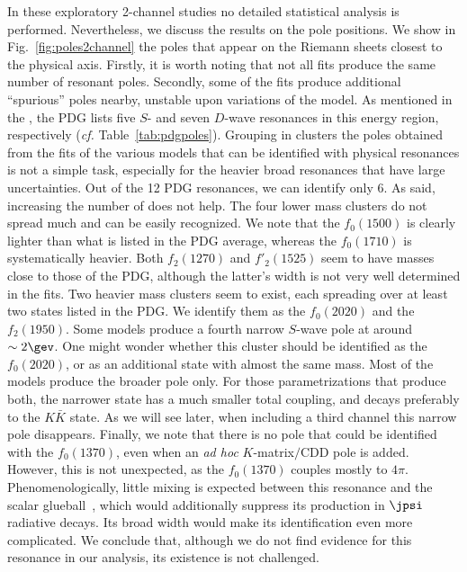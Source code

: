 In these exploratory 2-channel studies no detailed statistical analysis is  performed. Nevertheless, we discuss the results on the pole positions. 
We show in Fig.~\ref{fig:poles2channel} the poles that appear on the Riemann sheets closest to the physical axis. Firstly, it is worth noting that not all fits produce the same number of resonant poles. Secondly, some of the fits produce additional ``spurious'' poles nearby, unstable upon variations of the model.  As mentioned in the , the PDG lists five   $S$- and seven  $D$-wave resonances in this energy region, respectively ({\it cf.} Table~\ref{tab:pdgpoles}).
Grouping in clusters the poles obtained from the fits of the various models  that can be identified with physical resonances is not a simple task, especially for the heavier broad resonances that have large  uncertainties. 
Out of the 12 PDG resonances, we can identify only 6. As said, increasing the number of \KCDD does not help. 
The four lower mass clusters do not spread much and can be easily recognized. We note that the $f_0(1500)$ is clearly lighter than what is listed in the PDG average, whereas the $f_0(1710)$ is systematically heavier. Both $f_2(1270)$ and $f'_2(1525)$ seem to have masses close to those of the PDG, although the latter's width is not very well determined in  the fits.
Two heavier mass clusters seem to exist, each spreading over at least two states listed in the PDG. We identify them as the $f_0(2020)$ and the $f_2(1950)$. Some models produce a fourth narrow $S$-wave pole at around $\sim 2\gev$. One might wonder whether this cluster should be identified as the $f_0(2020)$, or as an additional state with almost the same mass. Most of the models produce the broader pole only. For those parametrizations that produce both, the narrower state has a much smaller total coupling, and decays preferably to the $K \bar K$ state. As we will see later, when including a third  channel this narrow pole disappears. 
Finally, we note that there is no pole that could be identified with the $f_0(1370)$, even when an {\em ad hoc} $K$-matrix$\big/$CDD pole is added. However, this is not unexpected, as the $f_0(1370)$ couples mostly to $4 \pi$. Phenomenologically, little mixing is expected between this resonance and the scalar glueball~\cite{Giacosa:2005zt,Giacosa:2005qr,Albaladejo:2008qa,Janowski:2014ppa}, which would additionally suppress its production in $\jpsi$ radiative decays. Its broad width would make its identification even more complicated. We conclude that, although we do not find evidence for this resonance in our analysis, its existence is not challenged.

